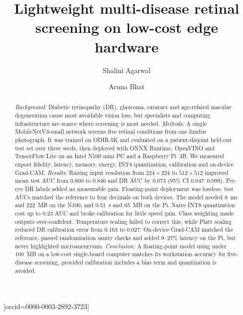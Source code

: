 \documentclass[a4paper,fleqn]{cas-sc}
\begin{document}
\let\WriteBookmarks\relax
\def\floatpagepagefraction{1}
\def\textpagefraction{.001}


\title [mode = title]{Lightweight multi-disease retinal screening on
low-cost edge hardware}

\author[1]{Shalini Agarwal}[orcid=0000-0003-2892-3723]
\cormark[1]

\author[1]{Aruna Bhat}



\begin{abstract}
\textit{Background:} Diabetic retinopathy (DR), glaucoma, cataract and
age-related macular degeneration cause most avoidable vision loss, but
specialists and computing infrastructure are scarce where screening is
most needed.
\textit{Methods:} A single MobileNetV3-small network screens five retinal
conditions from one fundus photograph. It was trained on ODIR-5K and
evaluated on a patient-disjoint held-out test set over three seeds, then
deployed with ONNX Runtime, OpenVINO and TensorFlow Lite on an Intel N100
mini PC and a Raspberry Pi~3B. We measured export fidelity, latency,
memory, energy, INT8 quantization, calibration and on-device Grad-CAM.
\textit{Results:} Raising input resolution from $224\times224$ to
$512\times512$ improved mean test AUC from 0.800 to 0.846 and DR AUC by
0.073 (95\% CI 0.047--0.099). Per-eye DR labels added no measurable gain.
Floating-point deployment was lossless: test AUCs matched the reference to
four decimals on both devices. The model needed 8~ms and 222~MB on the
N100, and 0.51~s and 65~MB on the Pi. Naive INT8 quantization cost up to
0.23 AUC and broke calibration for little speed gain. Class weighting
made outputs over-confident. Temperature scaling failed to correct this,
while Platt scaling reduced DR calibration error from 0.163 to 0.027.
On-device Grad-CAM matched the reference, passed randomisation sanity
checks and added 9--27\% latency on the Pi, but never highlighted
microaneurysms.
\textit{Conclusion:} A floating-point model using under 100~MB on a
low-cost single-board computer matches its workstation accuracy for
five-disease screening, provided calibration includes a bias term and
quantization is avoided.
\end{abstract}
\end{document}
